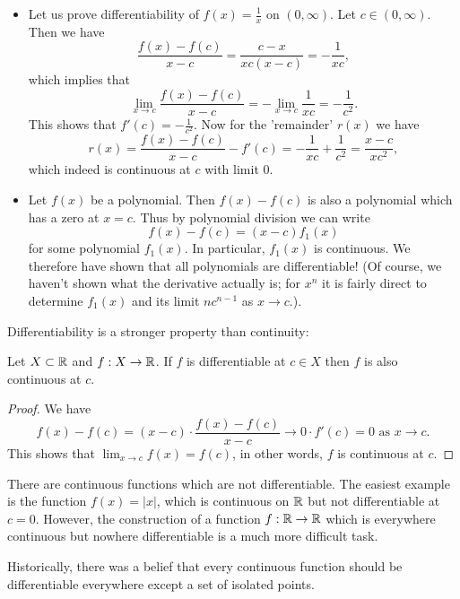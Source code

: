 \documentclass[10pt, a4paper]{article}
\begin{document}
\begin{example}\phantom{}
    \begin{itemize}
        \item Let us prove differentiability of $f(x) = \frac{1}{x}$ on $(0, \infty)$.
        Let $c \in (0, \infty)$.
        Then we have
        \[
        \frac{f(x) - f(c)}{x - c} = \frac{c - x}{xc(x - c)} = -\frac{1}{xc},
        \]
        which implies that
        \[
        \lim_{x \rightarrow c}\frac{f(x) - f(c)}{x - c} = -\lim_{x \rightarrow c}\frac{1}{xc} = -\frac{1}{c ^ 2}.
        \]
        This shows that $f'(c) = -\frac{1}{c ^ 2}$.
        Now for the 'remainder' $r(x)$ we have
        \[
        r(x) = \frac{f(x) - f(c)}{x - c} - f'(c) = -\frac{1}{xc} + \frac{1}{c ^ 2} = \frac{x - c}{xc ^ 2},
        \]
        which indeed is continuous at $c$ with limit $0$.

        \item Let $f(x)$ be a polynomial.
        Then $f(x) - f(c)$ is also a polynomial which has a zero at $x = c$.
        Thus by polynomial division we can write
        \[
        f(x) - f(c) = (x - c)f_1(x)
        \]
        for some polynomial $f_1(x)$.
        In particular,
        $f_1(x)$ is continuous.
        We therefore have shown that all polynomials are differentiable!
        (Of course,
        we haven't shown what the derivative actually is;
        for $x ^ n$ it is fairly direct to determine $f_1(x)$ and its limit $nc ^ {n - 1}$ as $x \rightarrow c$.).
    \end{itemize}
\end{example}

Differentiability is a stronger property than continuity:
\begin{theorem}\label{pre:analy:thm:iffdiffatcthencontatc}
    Let $X \subset \mathbb{R}$ and $f : X \rightarrow \mathbb{R}$.
    If $f$ is differentiable at $c \in X$ then $f$ is also continuous at $c$.
    \begin{proof}
        We have
        \[
        f(x) - f(c) = (x - c) \cdot \frac{f(x) - f(c)}{x - c} \rightarrow 0 \cdot f'(c) = 0\text{ as } x \rightarrow c.
        \]
        This shows that $\lim_{x \rightarrow c}f(x) = f(c)$,
        in other words,
        $f$ is continuous at $c$.
    \end{proof}
\end{theorem}

\begin{remark}
    There are continuous functions which are not differentiable.
    The easiest example is the function $f(x) = |x|$,
    which is continuous on $\mathbb{R}$ but not differentiable at $c = 0$.
    However,
    the construction of a function $f : \mathbb{R} \rightarrow \mathbb{R}$ which is everywhere continuous but nowhere differentiable is a much more difficult task.
    
    Historically,
    there was a belief that every continuous function should be differentiable everywhere except a set of isolated points.
\end{remark}
\end{document}
